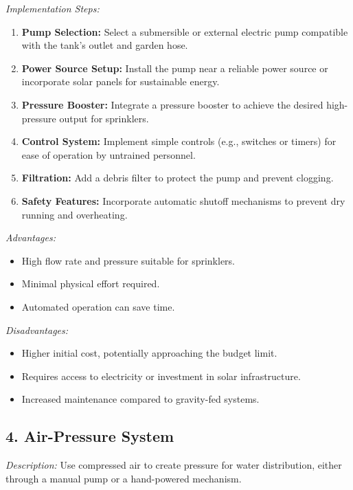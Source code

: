 \documentclass[12pt]{article}
\begin{document}
\noindent\textit{Implementation Steps:}
\begin{enumerate}[noitemsep, topsep=0pt]
\item \textbf{Pump Selection:} Select a submersible or external electric pump compatible with the tank’s outlet and garden hose.
\item \textbf{Power Source Setup:} Install the pump near a reliable power source or incorporate solar panels for sustainable energy.
\item \textbf{Pressure Booster:} Integrate a pressure booster to achieve the desired high-pressure output for sprinklers.
\item \textbf{Control System:} Implement simple controls (e.g., switches or timers) for ease of operation by untrained personnel.
\item \textbf{Filtration:} Add a debris filter to protect the pump and prevent clogging.
\item \textbf{Safety Features:} Incorporate automatic shutoff mechanisms to prevent dry running and overheating.
\end{enumerate}

\noindent\textit{Advantages:}
\begin{itemize}[noitemsep, topsep=0pt]
\item High flow rate and pressure suitable for sprinklers.
\item Minimal physical effort required.
\item Automated operation can save time.
\end{itemize}

\noindent\textit{Disadvantages:}
\begin{itemize}[noitemsep, topsep=0pt]
\item Higher initial cost, potentially approaching the budget limit.
\item Requires access to electricity or investment in solar infrastructure.
\item Increased maintenance compared to gravity-fed systems.
\end{itemize}
\newpage
\subsection*{4. Air-Pressure System}

\noindent\textit{Description:} Use compressed air to create pressure for water distribution, either through a manual pump or a hand-powered mechanism.
\end{document}
